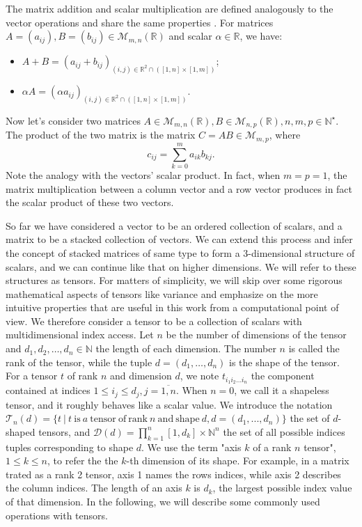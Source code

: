 \par The matrix addition and scalar multiplication are defined analogously to the vector operations and share the same properties \cite{LinAlSchaum}. For matrices $A=(a_{i j}),B=(b_{i j}) \in\mathcal{M}_{m,n}(\mathbb{R})$ and scalar $\alpha \in \mathbb{R}$, we have:
\begin{itemize}
\item $A+B = (a_{i j} + b_{i j})_{(i,j)\in\mathbb{R}^2 \cap ([1,n]\times[1,m])}$;
\item $\alpha A = (\alpha a_{i j})_{(i,j)\in\mathbb{R}^2 \cap ([1,n]\times[1,m])}$.
\end{itemize} 

\par Now let's consider two matrices $A \in\mathcal{M}_{m,n}(\mathbb{R}), B \in\mathcal{M}_{n,p}(\mathbb{R}), n,m,p \in \mathbb{N}^\star$. The product of the two matrix is the matrix $C = AB \in \mathcal{M}_{m,p}$, where
$$c_{i j} = \sum_{k=0}^{m} {a_{i k} b_{k j}}. $$
Note the analogy with the vectors' scalar product. In fact, when $m=p=1$, the matrix multiplication between a column vector and a row vector produces in fact the scalar product of these two vectors.

\par So far we have considered a vector to be an ordered collection of scalars, and a matrix to be a stacked collection of vectors. We can extend this process and infer the concept of stacked matrices of same type to form a 3-dimensional structure of scalars, and we can continue like that on higher dimensions. We will refer to these structures as tensors. For matters of simplicity, we will skip over some rigorous mathematical aspects of tensors \cite{TensorsPorat_2014} like variance and emphasize on the more intuitive properties that are useful in this work from a computational point of view. We therefore consider a tensor to be a collection of scalars with multidimensional index access. Let $n$ be the number of dimensions of the tensor and $d_1, d_2, \ldots, d_n \in \mathbb{N}$ the length of each dimension. The number $n$ is called the rank of the tensor, while the tuple $d=(d_1,\ldots,d_n)$ is the shape of the tensor. For a tensor $t$ of rank $n$ and dimension $d$, we note $t_{i_1 i_2 \ldots i_n}$ the component contained at indices $1 \leq i_j \leq d_j, j= \overline{1,n}$. When $n=0$, we call it a shapeless tensor, and it roughly behaves like a scalar value. We introduce the notation $\mathcal{T}_{n}(d)=\{t \ | \ t \ \mathrm{is} \ a \ \mathrm{tensor} \ \mathrm{of} \ \mathrm{rank} \ n \ \mathrm{and} \ \mathrm{shape} \ d, d=(d_1,...,d_n)\}$ the set of $d$-shaped tensors, and $\mathcal{D}(d)=\prod_{k=1}^{n}{[1,d_k]}\times \mathbb{N}^n$ the set of all possible indices tuples corresponding to shape $d$. We use the term "axis $k$ of a rank $n$ tensor", $1 \leq k \leq n$, to refer the the $k$-th dimension of its shape. For example, in a matrix trated as a rank 2 tensor, axis 1 names the rows indices, while axis 2 describes the column indices. The length of an axis $k$ is $d_k$, the largest possible index value of that dimension. In the following, we will describe some commonly used operations with tensors. \cite{D2l}

